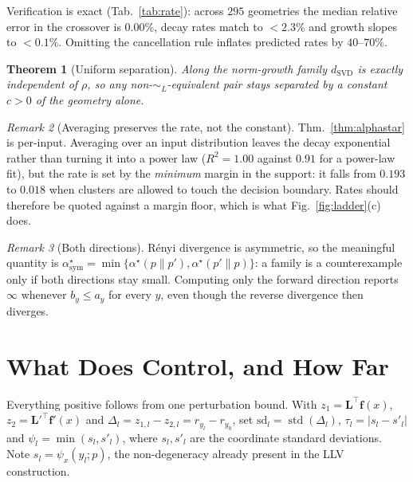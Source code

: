 \documentclass[10pt,letterpaper,twocolumn]{article}
\newcommand{\bff}{\mathbf{f}}
\newcommand{\bfL}{\mathbf{L}}
\newcommand{\dSVD}{d_{\mathrm{SVD}}}
\newcommand{\psix}{\psi_{x}}
\newcommand{\simL}{\sim_{L}}
\theoremstyle{plain}
\newtheorem{theorem}{Theorem}
\theoremstyle{definition}
\theoremstyle{remark}
\newtheorem{remark}[theorem]{Remark}
\begin{document}
Verification is exact (Tab.~\ref{tab:rate}): across $295$ geometries the
median relative error in the crossover is $0.00\%$, decay rates match to
$<2.3\%$ and growth slopes to $<0.1\%$. Omitting the cancellation rule inflates
predicted rates by $40$--$70\%$.

\begin{theorem}[Uniform separation]
\label{thm:lower}
Along the norm-growth family $\dSVD$ is \emph{exactly} independent of $\rho$,
so any non-$\simL$-equivalent pair stays separated by a constant $c>0$ of the
geometry alone.
\end{theorem}

\begin{remark}[Averaging preserves the rate, not the constant]
\label{rem:avg}
Thm.~\ref{thm:alphastar} is per-input. Averaging over an input distribution
leaves the decay exponential rather than turning it into a power law
($R^{2}=1.00$ against $0.91$ for a power-law fit), but the rate is set by the
\emph{minimum} margin in the support: it falls from $0.193$ to $0.018$ when
clusters are allowed to touch the decision boundary. Rates should therefore be
quoted against a margin floor, which is what Fig.~\ref{fig:ladder}(c) does.
\end{remark}

\begin{remark}[Both directions]
\label{rem:asym}
R\'enyi divergence is asymmetric, so the meaningful quantity is
$\alpha^{\star}_{\mathrm{sym}}=\min\{\alpha^{\star}(p\|p'),\alpha^{\star}(p'\|p)\}$:
a family is a counterexample only if both directions stay small. Computing only
the forward direction reports $\infty$ whenever $b_{y}\le a_{y}$ for every $y$,
even though the reverse divergence then diverges.
\end{remark}

\section{What Does Control, and How Far}
\label{sec:positive}

Everything positive follows from one perturbation bound. With
$z_{1}=\bfL^{\top}\bff(x)$, $z_{2}=\bfL'^{\top}\bff'(x)$ and
$\Delta_{l}=z_{1,l}-z_{2,l}=r_{y_{l}}-r_{y_{0}}$, set
$\mathrm{sd}_{l}=\operatorname{std}(\Delta_{l})$,
$\tau_{l}=|s_{l}-s'_{l}|$ and $\psi_{l}=\min(s_{l},s'_{l})$, where
$s_{l},s'_{l}$ are the coordinate standard deviations. Note
$s_{l}=\psix(y_{l};p)$, the non-degeneracy already present in the LLV
construction.
\end{document}
